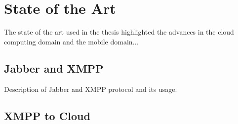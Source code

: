 
\chapter{State of the Art} %


The state of the art used in the thesis highlighted the advances in the cloud computing domain and the mobile domain...


\ifpdf
    \graphicspath{{X/figures/PNG/}{X/figures/PDF/}{X/figures/}}
\else
    \graphicspath{{X/figures/EPS/}{X/figures/}}
\fi


\section{Jabber and XMPP}
Description of Jabber and XMPP protocol and its usage.


\section{XMPP to Cloud}



